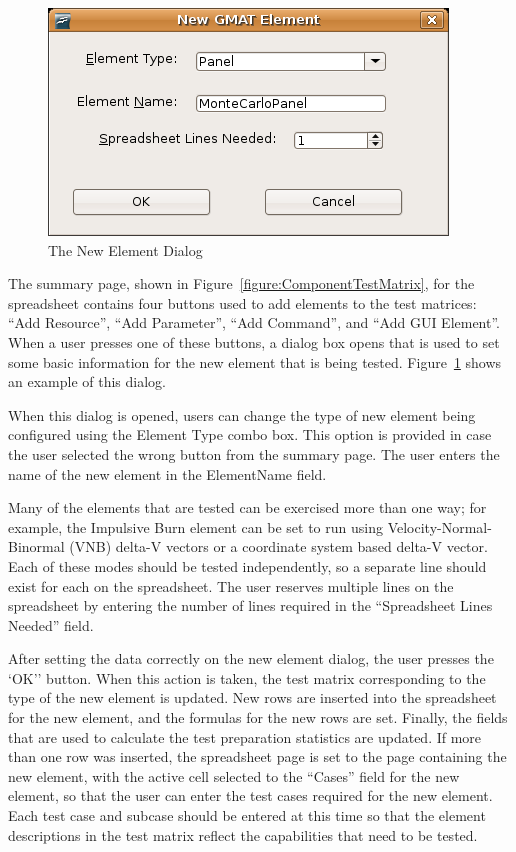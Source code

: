 \begin{figure}[htb]
\begin{center}
\includegraphics[200,114]{Images/AddingAnElement.png}
\caption{\label{figure:NewElement}The New Element Dialog}
\end{center}
\end{figure}

The summary page, shown in Figure~\ref{figure:ComponentTestMatrix}, for the spreadsheet contains
four buttons used to add elements to the test matrices: ``Add Resource'', ``Add Parameter'', ``Add
Command'', and ``Add GUI Element''.  When a user presses one of these buttons, a dialog box opens
that is used to set some basic information for the new element that is being tested.
Figure~\ref{figure:NewElement} shows an example of this dialog.

When this dialog is opened, users can change the type of new element being configured using the
Element Type combo box.  This option is provided in case the user selected the wrong button from the
summary page.  The user enters the name of the new element in the ElementName field.

Many of the elements that are tested can be exercised more than one way; for example, the Impulsive
Burn element can be set to run using Velocity-Normal-Binormal (VNB) delta-V vectors or a coordinate
system based delta-V vector.  Each of these modes should be tested independently, so a separate line
should exist for each on the spreadsheet.  The user reserves multiple lines on the spreadsheet by
entering the number of lines required in the ``Spreadsheet Lines Needed'' field.

After setting the data correctly on the new element dialog, the user presses the `OK'' button.  When
this action is taken, the test matrix corresponding to the type of the new element is updated. New
rows are inserted into the spreadsheet for the new element, and the formulas for the new rows are
set.  Finally, the fields that are used to calculate the test preparation statistics are updated.
If more than one row was inserted, the spreadsheet page is set to the page containing the new
element, with the active cell selected to the ``Cases'' field for the new element, so that the user
can enter the test cases required for the new element.  Each test case and subcase should be entered
at this time so that the element descriptions in the test matrix reflect the capabilities that need
to be tested.

